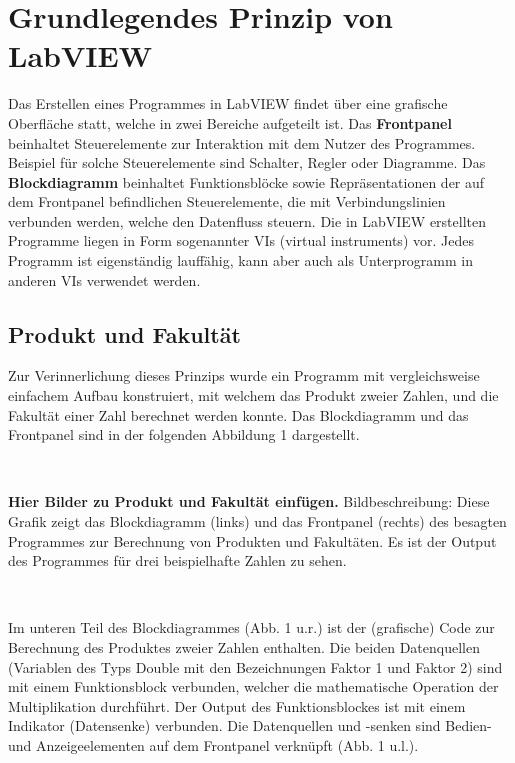\section{Grundlegendes Prinzip von LabVIEW}

	
Das Erstellen eines Programmes in LabVIEW findet über eine grafische Oberfläche statt, welche in zwei Bereiche aufgeteilt ist.
Das \textbf{Frontpanel} beinhaltet Steuerelemente zur Interaktion mit dem Nutzer des Programmes. Beispiel für solche Steuerelemente sind Schalter, Regler oder Diagramme. Das \textbf{Blockdiagramm} beinhaltet Funktionsblöcke sowie Repräsentationen der auf dem Frontpanel befindlichen Steuerelemente, die mit Verbindungslinien verbunden werden, welche den Datenfluss steuern.
Die in LabVIEW erstellten Programme liegen in Form sogenannter VIs (virtual instruments) vor. Jedes Programm ist eigenständig lauffähig, kann aber auch als Unterprogramm in anderen VIs verwendet werden.

\subsection{Produkt und Fakultät}

Zur Verinnerlichung dieses Prinzips wurde ein Programm mit vergleichsweise einfachem Aufbau konstruiert, mit welchem das Produkt zweier Zahlen, und die Fakultät einer Zahl berechnet werden konnte. Das Blockdiagramm und das Frontpanel sind in der folgenden Abbildung 1 dargestellt.

\

\textbf{Hier Bilder zu Produkt und Fakultät einfügen.} Bildbeschreibung: Diese Grafik zeigt das Blockdiagramm (links) und das Frontpanel (rechts) des besagten Programmes zur Berechnung von Produkten und Fakultäten. Es ist der Output des Programmes für drei beispielhafte Zahlen zu sehen.

\

Im unteren Teil des Blockdiagrammes (Abb. 1 u.r.) ist der (grafische) Code zur Berechnung des Produktes zweier Zahlen enthalten. Die beiden Datenquellen (Variablen des Typs Double mit den Bezeichnungen Faktor 1 und Faktor 2) sind mit einem Funktionsblock verbunden, welcher die mathematische Operation der Multiplikation durchführt. Der Output des Funktionsblockes ist mit einem Indikator (Datensenke) verbunden. Die Datenquellen und -senken sind Bedien- und Anzeigeelementen auf dem Frontpanel verknüpft (Abb. 1 u.l.).

